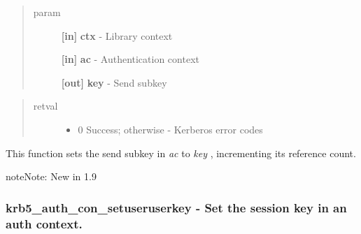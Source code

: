 \documentclass[letterpaper,10pt,english]{sphinxmanual}
\begin{document}
\begin{quote}\begin{description}
\item[{param}] \leavevmode
\textbf{{[}in{]}} \textbf{ctx} - Library context

\textbf{{[}in{]}} \textbf{ac} - Authentication context

\textbf{{[}out{]}} \textbf{key} - Send subkey

\end{description}\end{quote}
\begin{quote}\begin{description}
\item[{retval}] \leavevmode\begin{itemize}
\item {} 
0   Success; otherwise - Kerberos error codes

\end{itemize}

\end{description}\end{quote}

This function sets the send subkey in \emph{ac} to \emph{key} , incrementing its reference count.

\begin{notice}{note}{Note:}
New in 1.9
\end{notice}


\subsubsection{krb5\_auth\_con\_setuseruserkey -  Set the session key in an auth context.}
\label{appdev/refs/api/krb5_auth_con_setuseruserkey::doc}\label{appdev/refs/api/krb5_auth_con_setuseruserkey:krb5-auth-con-setuseruserkey-set-the-session-key-in-an-auth-context}

\begin{fulllineitems}
\label{appdev/refs/api/krb5_auth_con_setuseruserkey:krb5_auth_con_setuseruserkey}
\end{fulllineitems}
\end{document}
